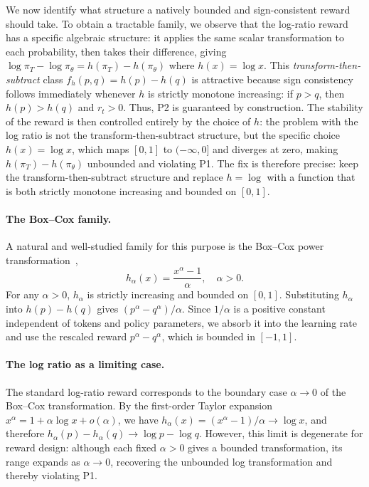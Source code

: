 We now identify what structure a natively bounded and sign-consistent reward should take.
To obtain a tractable family, we observe that the log-ratio reward has a specific algebraic structure: it applies the same scalar transformation to each probability, then takes their difference, giving $\log\pi_T - \log\pi_\theta = h(\pi_T) - h(\pi_\theta)$ where $h(x) = \log x$.
This \emph{transform-then-subtract} class \(f_h(p,q) = h(p) - h(q)\) is attractive because sign consistency follows immediately whenever \(h\) is strictly monotone increasing: if \(p > q\), then \(h(p) > h(q)\) and \(r_t > 0\). Thus, P2 is guaranteed by construction.
The stability of the reward is then controlled entirely by the choice of $h$: the problem with the log ratio is not the transform-then-subtract structure, but the specific choice $h(x) = \log x$, which maps $[0,1]$ to $(-\infty, 0]$ and diverges at zero, making $h(\pi_T) - h(\pi_\theta)$ unbounded and violating P1.
The fix is therefore precise: keep the transform-then-subtract structure and replace $h = \log$ with a function that is both strictly monotone increasing and bounded on $[0,1]$.

\paragraph{The Box--Cox family.}
A natural and well-studied family for this purpose is the Box--Cox power transformation~\citep{boxcox1964},
\begin{equation}
  h_\alpha(x) = \frac{x^\alpha - 1}{\alpha}, \quad \alpha > 0.
  \label{eq:boxcox}
\end{equation}
For any \(\alpha>0\), \(h_\alpha\) is strictly increasing and bounded on \([0,1]\). Substituting \(h_\alpha\) into \(h(p)-h(q)\) gives \((p^\alpha-q^\alpha)/\alpha\). Since \(1/\alpha\) is a positive constant independent of tokens and policy parameters, we absorb it into the learning rate and use the rescaled reward \(p^\alpha-q^\alpha\), which is bounded in \([-1,1]\).

\paragraph{The log ratio as a limiting case.}
The standard log-ratio reward corresponds to the boundary case \(\alpha \to 0\) of the Box--Cox transformation. By the first-order Taylor expansion \(x^\alpha = 1+\alpha\log x+o(\alpha)\), we have \(h_\alpha(x)=(x^\alpha-1)/\alpha \to \log x\), and therefore \(h_\alpha(p)-h_\alpha(q)\to \log p-\log q\). However, this limit is degenerate for reward design: although each fixed \(\alpha>0\) gives a bounded transformation, its range expands as \(\alpha\to0\), recovering the unbounded log transformation and thereby violating P1.

